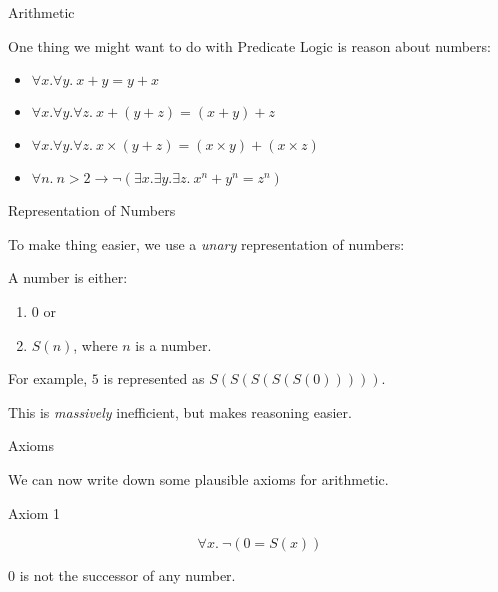 \documentclass[xetex,aspectratio=169,14pt,hyperref={pdfpagelabels=true,pdflang={en-GB}}]{beamer}
\begin{document}

\begin{frame}
  {Arithmetic}

  One thing we might want to do with Predicate Logic is reason about
  numbers:

  \bigskip

  \begin{itemize}
  \item $\forall x. \forall y.~x + y = y + x$
  \item $\forall x. \forall y.\forall z.~x + (y + z) = (x+y) + z$
  \item $\forall x. \forall y. \forall z.~x \times (y+z) = (x \times y) + (x \times z)$
  \item $\forall n.~n > 2 \to \lnot(\exists x. \exists y. \exists z.~x^n + y^n = z^n)$
  \end{itemize}
\end{frame}

\begin{frame}
  {Representation of Numbers}

  To make thing easier, we use a \emph{unary} representation of numbers:

  \bigskip

  A number is either:
  \begin{enumerate}
  \item $0$ or
  \item $S(n)$, where $n$ is a number.
  \end{enumerate}

  \bigskip

  For example, $5$ is represented as $S(S(S(S(S(0)))))$.

  \bigskip

  This is \emph{massively} inefficient, but makes reasoning easier.
\end{frame}

\begin{frame}
  {Axioms}

  We can now write down some plausible axioms for arithmetic.
\end{frame}

\begin{frame}
  {Axiom 1}

  \begin{displaymath}
    \forall x.~\lnot(0 = S(x))
  \end{displaymath}

  \bigskip

  $0$ is not the successor of any number.
\end{frame}
\end{document}
